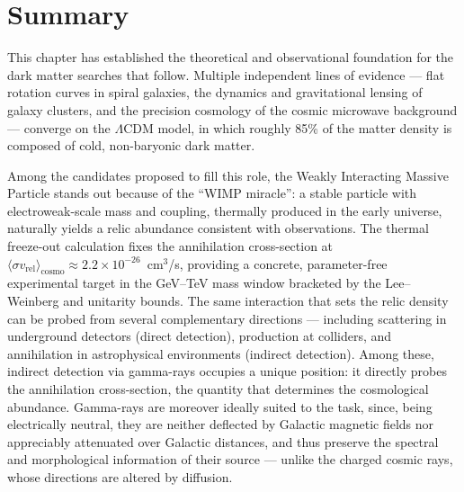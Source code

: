 
\section{Summary}
\label{sec:ch1_summary}

This chapter has established the theoretical and observational foundation for the dark matter searches that follow.
Multiple independent lines of evidence --- flat rotation curves in spiral galaxies, the dynamics and gravitational lensing of galaxy clusters, and the precision cosmology of the cosmic microwave background --- converge on the $\Lambda$CDM model, in which roughly 85\% of the matter density is composed of cold, non-baryonic dark matter.

Among the candidates proposed to fill this role, the Weakly Interacting Massive Particle stands out because of the ``WIMP miracle'': a stable particle with electroweak-scale mass and coupling, thermally produced in the early universe, naturally yields a relic abundance consistent with observations.
The thermal freeze-out calculation fixes the annihilation cross-section at $\langle \sigma v_\mathrm{rel} \rangle_\mathrm{cosmo} \approx 2.2 \times 10^{-26}$~cm$^3$/s, providing a concrete, parameter-free experimental target in the GeV--TeV mass window bracketed by the Lee--Weinberg and unitarity bounds.
The same interaction that sets the relic density can be probed from several complementary directions --- including scattering in underground detectors (direct detection), production at colliders, and annihilation in astrophysical environments (indirect detection).
Among these, indirect detection via gamma-rays occupies a unique position: it directly probes the annihilation cross-section, the quantity that determines the cosmological abundance.
Gamma-rays are moreover ideally suited to the task, since, being electrically neutral, they are neither deflected by Galactic magnetic fields nor appreciably attenuated over Galactic distances, and thus preserve the spectral and morphological information of their source --- unlike the charged cosmic rays, whose directions are altered by diffusion.

